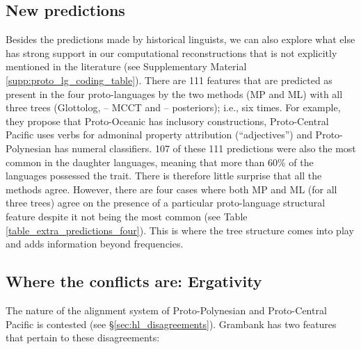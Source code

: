 \documentclass[12pt,letterpaper]{article}
\begin{document}
\FloatBarrier
\subsection{New predictions}
\label{sec:new_predictions}

Besides the predictions made by historical linguists, we can also explore what else has strong support in our computational reconstructions that is not explicitly mentioned in the literature (see Supplementary Material \ref{supp:proto_lg_coding_table}). There are 111 features that are predicted as present in the four proto-languages by the two methods (MP and ML) with all three trees (Glottolog, \citealt{grayetal_2009} -- MCCT and \citealt{grayetal_2009} -- posteriors); i.e., six times. For example, they propose that Proto-Oceanic has inclusory constructions, Proto-Central Pacific uses verbs for admoninal property attribution (``adjectives'') and Proto-Polynesian has numeral classifiers. 107 of these 111 predictions were also the most common in the daughter languages, meaning that more than 60\% of the languages possessed the trait. There is therefore little surprise that all the methods agree. However, there are four cases where both MP and ML (for all three trees) agree on the presence of a particular proto-language structural feature despite it not being the most common (see Table \ref{table_extra_predictions_four}). This is where the tree structure comes into play and adds information beyond frequencies.






\FloatBarrier
\subsection{Where the conflicts are: Ergativity}
\label{sec:conflicts}
The nature of the alignment system of Proto-Polynesian and Proto-Central Pacific is contested (see §\ref{sec:hl_disagreements}). Grambank has two features that pertain to these disagreements:
\end{document}
